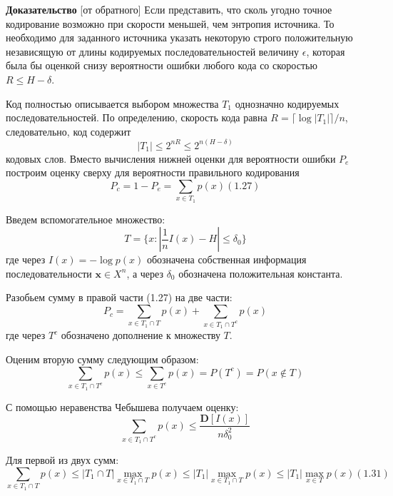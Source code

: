 \documentclass[14pt]{article}
\begin{document}
\textbf{Доказательство} [от обратного] Если представить, что сколь угодно точное кодирование возможно при скорости меньшей, чем энтропия источника. То необходимо для заданного источника указать некоторую строго положительную независящую от длины кодируемых последовательностей величину \( \epsilon \), которая была бы оценкой снизу вероятности ошибки любого кода со скоростью \( R \leq H - \delta\).

Код полностью описывается выбором множества \(T_1\) однозначно кодируемых последовательностей. По определению, скорость кода равна \(R = \lceil \log |T_1| \rceil / n\), следовательно, код содержит
\begin{displaymath}
    |T_1| \leq 2^{nR} \leq 2^{n(H-\delta)}
\end{displaymath}
кодовых слов. Вместо вычисления нижней оценки для вероятности ошибки \(P_e\) построим оценку сверху для вероятности правильного кодирования
\begin{displaymath}
    P_c = 1 - P_e = \sum_{x \in T_1} p(x)    (1.27)
\end{displaymath}

Введем вспомогательное множество:
\begin{displaymath}
    T = \Big\{x: |\frac{1}{n}I(x) - H| \leq \delta_0\Big\}
\end{displaymath}
где через \(I(x) = -\log p(x)\) обозначена собственная информация последовательности \(\textbf{x} \in X^n\), а через \(\delta_0\) обозначена положительная константа.

Разобьем сумму в правой части (1.27) на две части:
\begin{displaymath}
    P_c = \sum_{x \in T_1 \cap T} p(x) + \sum_{x \in T_1 \cap T^c} p(x)
\end{displaymath}
где через \(T^c\) обозначено дополнение к множеству \(T\).

Оценим вторую сумму следующим образом:
\begin{displaymath}
    \sum_{x \in T_1 \cap T^c} p(x) \leq \sum_{x \in T^c} p(x) = P(T^c) = P(x \notin T)
\end{displaymath}

С помощью неравенства Чебышева получаем оценку:
\begin{displaymath}
    \sum_{x \in T_1 \cap T^c} p(x) \leq \frac{\textbf{D}[I(x)]}{n\delta_0^2}
\end{displaymath}

Для первой из двух сумм:
\begin{displaymath}
    \sum_{x \in T_1 \cap T} p(x) \leq |T_1 \cap T| \max_{x \in T_1 \cap T} p(x) \leq |T_1| \max_{x \in T_1 \cap T} p(x) \leq |T_1| \max_{x \in T} p(x)     (1.31)
\end{displaymath}
\end{document}
